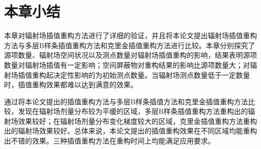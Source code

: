 \section{本章小结}
本章对辐射场插值重构方法进行了详细的验证，并且将本论文提出辐射场插值重构方法与多层B样条插值重构方法和克里金插值重构方法进行比较。本章分别探究了源项数量、辐射场空间状况以及测点数量对辐射场插值重构的影响，结果表明源项数量对辐射场插值有一定影响；空间屏蔽物对重构结果的影响比源项数量大；对辐射场插值重构起决定性影响的为初始测点数量。当辐射场测点数量低于一定数量时，插值重构效果都难以达到满意的效果。

通过将本论文提出的插值重构方法与多层B样条插值方法和克里金插值重构方法比较，发现在辐射场剂量分布较为平缓的区域，多层B样条插值重构方法重构出的辐射场效果较好；在辐射场剂量分布变化梯度较大的区域，克里金插值重构方法重构出的辐射场效果较好。总体来说，本论文提出的插值重构效果在不同区域均能重构出不错的效果。三种插值重构方法在重构时间上均能满足应用要求。
